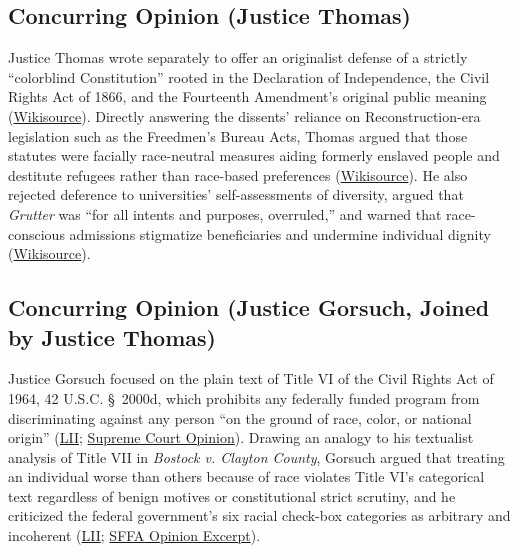 \documentclass[12pt]{article}
\begin{document}
\subsection{Concurring Opinion (Justice Thomas)}

Justice Thomas wrote separately to offer an originalist defense of a strictly ``colorblind Constitution'' rooted in the Declaration of Independence, the Civil Rights Act of 1866, and the Fourteenth Amendment's original public meaning (\href{https://en.wikisource.org/wiki/Students_for_Fair_Admissions_v._President_and_Fellows_of_Harvard_College/Opinion_of_Justice_Thomas}{Wikisource}). Directly answering the dissents' reliance on Reconstruction-era legislation such as the Freedmen's Bureau Acts, Thomas argued that those statutes were facially race-neutral measures aiding formerly enslaved people and destitute refugees rather than race-based preferences (\href{https://en.wikisource.org/wiki/Students_for_Fair_Admissions_v._President_and_Fellows_of_Harvard_College/Opinion_of_Justice_Thomas}{Wikisource}). He also rejected deference to universities' self-assessments of diversity, argued that \textit{Grutter} was ``for all intents and purposes, overruled,'' and warned that race-conscious admissions stigmatize beneficiaries and undermine individual dignity (\href{https://en.wikisource.org/wiki/Students_for_Fair_Admissions_v._President_and_Fellows_of_Harvard_College/Opinion_of_Justice_Thomas}{Wikisource}).

\subsection{Concurring Opinion (Justice Gorsuch, Joined by Justice Thomas)}

Justice Gorsuch focused on the plain text of Title VI of the Civil Rights Act of 1964, 42 U.S.C. \S~2000d, which prohibits any federally funded program from discriminating against any person ``on the ground of race, color, or national origin'' (\href{https://www.law.cornell.edu/supremecourt/text/20-1199}{LII}; \href{https://www.supremecourt.gov/opinions/22pdf/20-1199_hgdj.pdf}{Supreme Court Opinion}). Drawing an analogy to his textualist analysis of Title VII in \textit{Bostock v. Clayton County}, Gorsuch argued that treating an individual worse than others because of race violates Title VI's categorical text regardless of benign motives or constitutional strict scrutiny, and he criticized the federal government's six racial check-box categories as arbitrary and incoherent (\href{https://www.law.cornell.edu/supremecourt/text/20-1199}{LII}; \href{https://tikvah.org/wp-content/uploads/2026/05/Students-for-Fair-Admissions.pdf}{SFFA Opinion Excerpt}).
\end{document}
